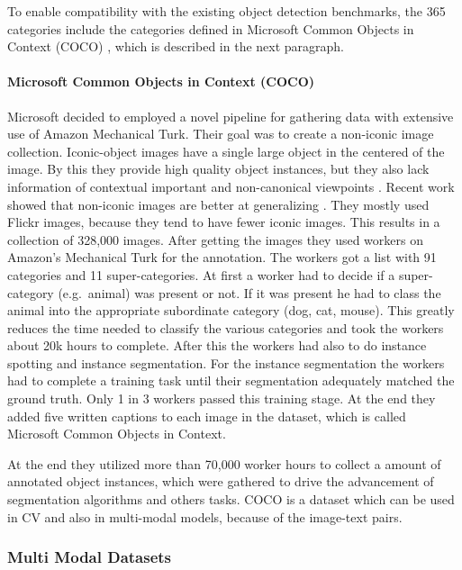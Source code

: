 \documentclass[
]{krantz}
\begin{document}
To enable compatibility with the existing object detection benchmarks, the 365 categories include the categories defined in Microsoft Common Objects in Context (COCO) \citep{lin2014microsoft}, which is described in the next paragraph.

\hypertarget{microsoft-common-objects-in-context-coco}{%
\paragraph{Microsoft Common Objects in Context (COCO)}\label{microsoft-common-objects-in-context-coco}}

Microsoft decided to employed a novel pipeline for gathering data with extensive use of Amazon Mechanical Turk. Their goal was to create a non-iconic image collection. Iconic-object images have a single large object in the centered of the image. By this they provide high quality object instances, but they also lack information of contextual important and non-canonical viewpoints \citep{lin2014microsoft}. Recent work showed that non-iconic images are better at generalizing \citep{torralba2011unbiased}. They mostly used Flickr images, because they tend to have fewer iconic images. This results in a collection of 328,000 images. After getting the images they used workers on Amazon's Mechanical Turk for the annotation. The workers got a list with 91 categories and 11 super-categories. At first a worker had to decide if a super-category (e.g.~animal) was present or not. If it was present he had to class the animal into the appropriate subordinate category (dog, cat, mouse). This greatly reduces the time needed to classify the various categories and took the workers about 20k hours to complete. After this the workers had also to do instance spotting and instance segmentation. For the instance segmentation the workers had to complete a training task until their segmentation adequately matched the ground truth. Only 1 in 3 workers passed this training stage. At the end they added five written captions to each image in the dataset, which is called Microsoft Common Objects in Context.

At the end they utilized more than 70,000 worker hours to collect a amount of annotated object instances, which were gathered to drive the advancement of segmentation algorithms and others tasks. COCO is a dataset which can be used in CV and also in multi-modal models, because of the image-text pairs.

\hypertarget{multi-modal-datasets}{%
\subsubsection{Multi Modal Datasets}\label{multi-modal-datasets}}
\end{document}
